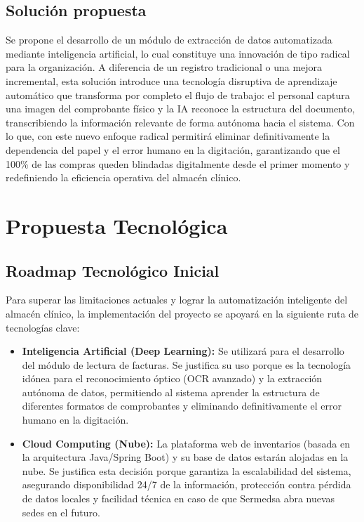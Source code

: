 \documentclass[12pt,a4paper]{article}
\begin{document}
\subsection{Solución propuesta}

Se propone el desarrollo de un módulo de extracción de datos automatizada mediante inteligencia artificial, lo cual constituye una innovación de tipo radical para la organización. A diferencia de un registro tradicional o una mejora incremental, esta solución introduce una tecnología disruptiva de aprendizaje automático que transforma por completo el flujo de trabajo: el personal captura una imagen del comprobante físico y la IA reconoce la estructura del documento, transcribiendo la información relevante de forma autónoma hacia el sistema. Con lo que, con este nuevo enfoque radical permitirá eliminar definitivamente la dependencia del papel y el error humano en la digitación, garantizando que el 100\% de las compras queden blindadas digitalmente desde el primer momento y redefiniendo la eficiencia operativa del almacén clínico.

\section{Propuesta Tecnológica}

\subsection{Roadmap Tecnológico Inicial}
Para superar las limitaciones actuales y lograr la automatización inteligente del almacén clínico, la implementación del proyecto se apoyará en la siguiente ruta de tecnologías clave:
\begin{itemize}
    \item \textbf{Inteligencia Artificial (Deep Learning):} Se utilizará para el desarrollo del módulo de lectura de facturas. Se justifica su uso porque es la tecnología idónea para el reconocimiento óptico (OCR avanzado) y la extracción autónoma de datos, permitiendo al sistema aprender la estructura de diferentes formatos de comprobantes y eliminando definitivamente el error humano en la digitación.
    \item \textbf{Cloud Computing (Nube):} La plataforma web de inventarios (basada en la arquitectura Java/Spring Boot) y su base de datos estarán alojadas en la nube. Se justifica esta decisión porque garantiza la escalabilidad del sistema, asegurando disponibilidad 24/7 de la información, protección contra pérdida de datos locales y facilidad técnica en caso de que Sermedsa abra nuevas sedes en el futuro.
\end{itemize}
\end{document}
